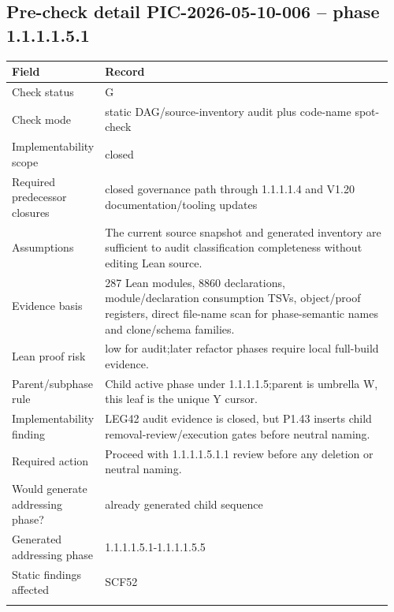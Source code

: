\subsection*{Pre-check detail PIC-2026-05-10-006 -- phase 1.1.1.1.5.1}
\begin{longtable}{L{0.18\linewidth} L{0.78\linewidth}}
\hline
\textbf{Field} & \textbf{Record}\\
\hline
Check status & G\\
\hline\addlinespace[0.20em]
Check mode & static DAG/\allowbreak{}source-inventory audit plus code-name spot-check\\
\hline\addlinespace[0.20em]
Implementability scope & closed\\
\hline\addlinespace[0.20em]
Required predecessor closures & closed governance path through 1.1.1.1.4 and V1.20 documentation/\allowbreak{}tooling updates\\
\hline\addlinespace[0.20em]
Assumptions & The current source snapshot and generated inventory are sufficient to audit classification completeness without editing Lean source.\\
\hline\addlinespace[0.20em]
Evidence basis & 287 Lean modules, 8860 declarations, module/\allowbreak{}declaration consumption TSVs, object/\allowbreak{}proof registers, direct file-name scan for phase-semantic names and clone/\allowbreak{}schema families.\\
\hline\addlinespace[0.20em]
Lean proof risk & low for audit;\newline later refactor phases require local full-build evidence.\\
\hline\addlinespace[0.20em]
Parent/\allowbreak{}subphase rule & Child active phase under 1.1.1.1.5;\newline parent is umbrella W, this leaf is the unique Y cursor.\\
\hline\addlinespace[0.20em]
Implementability finding & LEG42 audit evidence is closed, but P1.43 inserts child removal-review/\allowbreak{}execution gates before neutral naming.\\
\hline\addlinespace[0.20em]
Required action & Proceed with 1.1.1.1.5.1.1 review before any deletion or neutral naming.\\
\hline\addlinespace[0.20em]
Would generate addressing phase? & already generated child sequence\\
\hline\addlinespace[0.20em]
Generated addressing phase & 1.1.1.1.5.1-1.1.1.1.5.5\\
\hline\addlinespace[0.20em]
Static findings affected & SCF52\\
\hline\addlinespace[0.20em]
\end{longtable}
